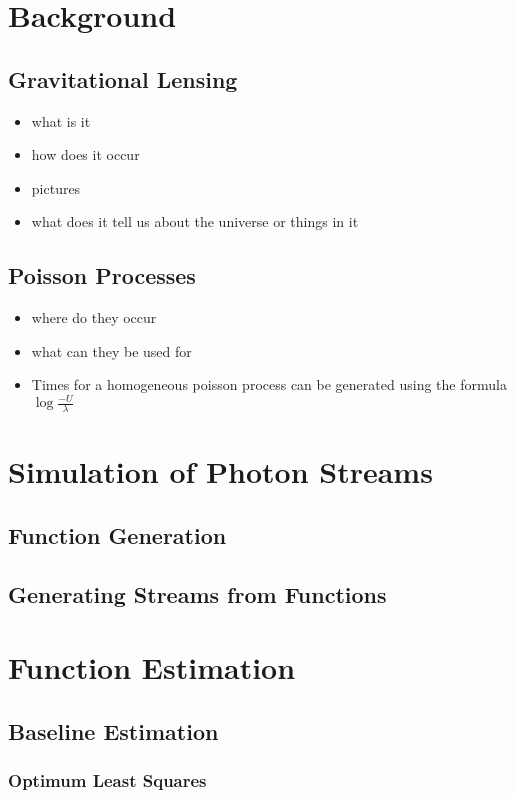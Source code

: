 \documentclass[a4paper,12pt]{article}
\begin{document}
\section{Background}
\label{sec-2}
\subsection{Gravitational Lensing}
\label{sec-2-1}

\begin{itemize}
\item what is it
\item how does it occur
\item pictures
\item what does it tell us about the universe or things in it
\end{itemize}
\subsection{Poisson Processes}
\label{sec-2-2}

\begin{itemize}
\item where do they occur
\item what can they be used for
\item Times for a homogeneous poisson process can be generated using
     the formula $\log\frac{-U}{\lambda}$
\end{itemize}
\section{Simulation of Photon Streams}
\label{sec-3}
\subsection{Function Generation}
\label{sec-3-1}
\subsection{Generating Streams from Functions}
\label{sec-3-2}
\section{Function Estimation}
\label{sec-4}
\subsection{Baseline Estimation}
\label{sec-4-1}
\subsubsection{Optimum Least Squares}
\label{sec-4-1-1}
\end{document}
